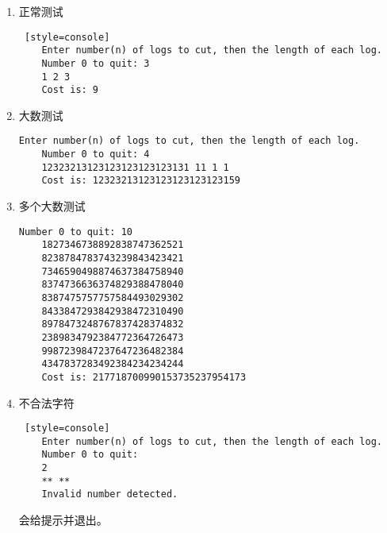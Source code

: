 \begin{enumerate}
    \item 正常测试
\begin{lstlisting} [style=console]
    Enter number(n) of logs to cut, then the length of each log.
    Number 0 to quit: 3
    1 2 3
    Cost is: 9
\end{lstlisting}

    \item 大数测试
\begin{lstlisting}[style=console]
    Enter number(n) of logs to cut, then the length of each log.
    Number 0 to quit: 4
    12323213123123123123123131 11 1 1
    Cost is: 12323213123123123123123159
\end{lstlisting}

    \item 多个大数测试
\begin{lstlisting}[style=console]
    Number 0 to quit: 10
    1827346738892838747362521
    8238784783743239843423421
    7346590498874637384758940
    8374736636374829388478040
    8387475757757584493029302
    8433847293842938472310490
    8978473248767837428374832
    2389834792384772364726473
    9987239847237647236482384
    4347837283492384234234244
    Cost is: 217718700990153735237954173
\end{lstlisting}

\item 不合法字符
\begin{lstlisting} [style=console]
    Enter number(n) of logs to cut, then the length of each log.
    Number 0 to quit: 
    2
    ** **
    Invalid number detected.
\end{lstlisting}
    会给提示并退出。
    
\end{enumerate}